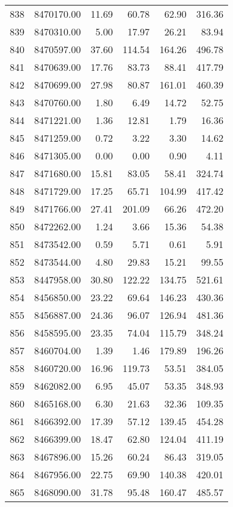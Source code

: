 \begin{table}[ht]
\begin{tabular}{rrrrrr}
  838 & 8470170.00 & 11.69 & 60.78 & 62.90 & 316.36 \\ 
  839 & 8470310.00 & 5.00 & 17.97 & 26.21 & 83.94 \\ 
  840 & 8470597.00 & 37.60 & 114.54 & 164.26 & 496.78 \\ 
  841 & 8470639.00 & 17.76 & 83.73 & 88.41 & 417.79 \\ 
  842 & 8470699.00 & 27.98 & 80.87 & 161.01 & 460.39 \\ 
  843 & 8470760.00 & 1.80 & 6.49 & 14.72 & 52.75 \\ 
  844 & 8471221.00 & 1.36 & 12.81 & 1.79 & 16.36 \\ 
  845 & 8471259.00 & 0.72 & 3.22 & 3.30 & 14.62 \\ 
  846 & 8471305.00 & 0.00 & 0.00 & 0.90 & 4.11 \\ 
  847 & 8471680.00 & 15.81 & 83.05 & 58.41 & 324.74 \\ 
  848 & 8471729.00 & 17.25 & 65.71 & 104.99 & 417.42 \\ 
  849 & 8471766.00 & 27.41 & 201.09 & 66.26 & 472.20 \\ 
  850 & 8472262.00 & 1.24 & 3.66 & 15.36 & 54.38 \\ 
  851 & 8473542.00 & 0.59 & 5.71 & 0.61 & 5.91 \\ 
  852 & 8473544.00 & 4.80 & 29.83 & 15.21 & 99.55 \\ 
  853 & 8447958.00 & 30.80 & 122.22 & 134.75 & 521.61 \\ 
  854 & 8456850.00 & 23.22 & 69.64 & 146.23 & 430.36 \\ 
  855 & 8456887.00 & 24.36 & 96.07 & 126.94 & 481.36 \\ 
  856 & 8458595.00 & 23.35 & 74.04 & 115.79 & 348.24 \\ 
  857 & 8460704.00 & 1.39 & 1.46 & 179.89 & 196.26 \\ 
  858 & 8460720.00 & 16.96 & 119.73 & 53.51 & 384.05 \\ 
  859 & 8462082.00 & 6.95 & 45.07 & 53.35 & 348.93 \\ 
  860 & 8465168.00 & 6.30 & 21.63 & 32.36 & 109.35 \\ 
  861 & 8466392.00 & 17.39 & 57.12 & 139.45 & 454.28 \\ 
  862 & 8466399.00 & 18.47 & 62.80 & 124.04 & 411.19 \\ 
  863 & 8467896.00 & 15.26 & 60.24 & 86.43 & 319.05 \\ 
  864 & 8467956.00 & 22.75 & 69.90 & 140.38 & 420.01 \\ 
  865 & 8468090.00 & 31.78 & 95.48 & 160.47 & 485.57 \\ 

\end{tabular}
\end{table}
